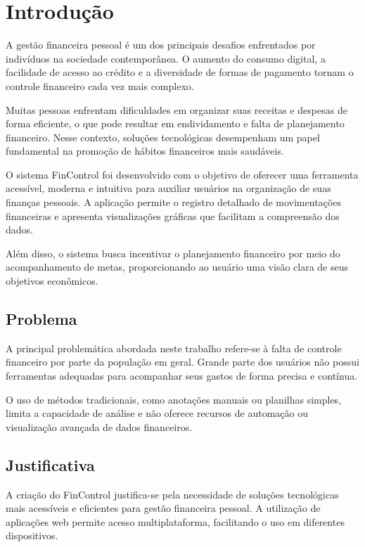 \documentclass[12pt,oneside,a4paper,chapter=TITLE]{abntex2}
\begin{document}
\tableofcontents*
\newpage


\textual

\chapter{Introdução}

A gestão financeira pessoal é um dos principais desafios enfrentados por indivíduos na sociedade contemporânea. O aumento do consumo digital, a facilidade de acesso ao crédito e a diversidade de formas de pagamento tornam o controle financeiro cada vez mais complexo.

Muitas pessoas enfrentam dificuldades em organizar suas receitas e despesas de forma eficiente, o que pode resultar em endividamento e falta de planejamento financeiro. Nesse contexto, soluções tecnológicas desempenham um papel fundamental na promoção de hábitos financeiros mais saudáveis.

O sistema FinControl foi desenvolvido com o objetivo de oferecer uma ferramenta acessível, moderna e intuitiva para auxiliar usuários na organização de suas finanças pessoais. A aplicação permite o registro detalhado de movimentações financeiras e apresenta visualizações gráficas que facilitam a compreensão dos dados.

Além disso, o sistema busca incentivar o planejamento financeiro por meio do acompanhamento de metas, proporcionando ao usuário uma visão clara de seus objetivos econômicos.


\section{Problema}

A principal problemática abordada neste trabalho refere-se à falta de controle financeiro por parte da população em geral. Grande parte dos usuários não possui ferramentas adequadas para acompanhar seus gastos de forma precisa e contínua.

O uso de métodos tradicionais, como anotações manuais ou planilhas simples, limita a capacidade de análise e não oferece recursos de automação ou visualização avançada de dados financeiros.


\section{Justificativa}

A criação do FinControl justifica-se pela necessidade de soluções tecnológicas mais acessíveis e eficientes para gestão financeira pessoal. A utilização de aplicações web permite acesso multiplataforma, facilitando o uso em diferentes dispositivos.
\end{document}
